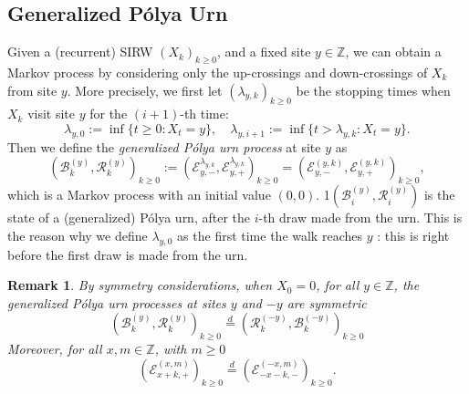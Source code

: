 \documentclass[twoside,12pt,a4paper]{article}
\newtheorem{remark}{Remark}[section]
\numberwithin{equation}{section}
\newcommand{\comment}[1]{\textcolor{blue}{#1}}
\begin{document}
	\subsection{Generalized P\'{o}lya  Urn}
	Given a (recurrent) SIRW $(X_k)_{k\geq 0}$, and a fixed site $y\in \mathbb{Z}$, we can obtain a Markov process by considering only the up-crossings and down-crossings of $X_k$ from site $y$. More precisely, we first let $(\lambda_{y,k})_{k\geq 0}$ be the stopping times when $X_k$ visit site $y$ for the $\left( i+1 \right) $-th time:
	\[
		\lambda_{y,0} :=\inf\{ t\geq 0: X_t = y \} , \quad \lambda_{y,i+1} := \inf\{ t> \lambda_{y, k}: X_t = y \}.
	   \] 
	   Then we define the \textit{generalized P\'olya urn process} at site $y$ as 
	  \begin{equation} \label{eq: RW to GPU}
	   \left(\mathcal{B}^{(y)}_{k},\mathcal{R}^{(y)}_{k} \right)_{k\ge 0}
	   :=\left(\mathcal{E}^{\lambda_{y,k}}_{y,-}, \mathcal{E}^{\lambda_{y,k}}_{y,+}\right)_{k\geq 0} 
	   =  \left(\mathcal{E}^{(y,k)}_{y,-}, \mathcal{E}^{(y,k)}_{y,+}\right)_{k\geq 0},
	   \end{equation}
	   which is a Markov process with an initial value $(0,0)$. 
	   1$\left(\mathcal{B}_{i}^{(y)},\mathcal{R}_{i}^{(y)} \right)$ is the state of a (generalized) P\'olya urn, after the $i$-th draw made from the urn. This is the reason why we define $\lambda_{y, 0}$ as the first time the walk reaches $y$ : this is right before the first draw is made from the urn. 
	\begin{remark}
		\label{rem:symmetry}
		By symmetry considerations, when $X_0 = 0$, for all $y \in \mathbb{Z}$, the generalized P\'{o}lya urn processes at sites $y$ and $-y$ are symmetric
		$$\left(\mathcal{B}^{(y)}_{k},\mathcal{R}^{(y)}_{k} \right)_{k\ge 0}
		\overset{d}{=} 
		\left(\mathcal{R}^{(-y)}_{k},\mathcal{B}^{(-y)}_{k} \right)_{k\ge 0} $$
		Moreover, for all $x, m \in \mathbb{Z}$, with $m\geq 0$
\[
		 \left(\mathcal{E}^{(x,m)}_{x+k,+} \right)_{k\geq 0} \overset{d}{=} \left(\mathcal{E}^{(-x,m)}_{-x-k,-} \right)_{k\geq 0}.
		\]
	   \end{remark}

	   
	 
\end{document}
